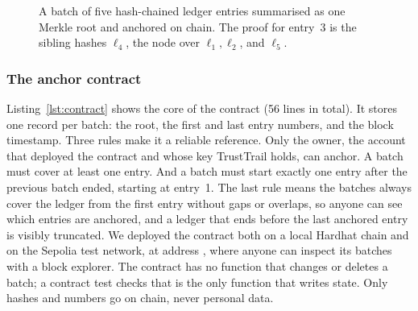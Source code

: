 \begin{figure}[t]
\centering
{}
\caption{A batch of five hash-chained ledger entries summarised as one Merkle root and anchored on chain. The proof for entry~3 is the sibling hashes $\ell_4$, the node over $\ell_1,\ell_2$, and $\ell_5$.}
\label{fig:merkle}
\end{figure}

\subsubsection{The anchor contract}
Listing~\ref{lst:contract} shows the core of the  contract (56 lines in total). It stores one record per batch: the root, the first and last entry numbers, and the block timestamp. Three rules make it a reliable reference. Only the owner, the account that deployed the contract and whose key TrustTrail holds, can anchor. A batch must cover at least one entry. And a batch must start exactly one entry after the previous batch ended, starting at entry~1. The last rule means the batches always cover the ledger from the first entry without gaps or overlaps, so anyone can see which entries are anchored, and a ledger that ends before the last anchored entry is visibly truncated. We deployed the contract both on a local Hardhat chain and on the Sepolia test network, at address , where anyone can inspect its batches with a block explorer. The contract has no function that changes or deletes a batch; a contract test checks that  is the only function that writes state. Only hashes and numbers go on chain, never personal data.

